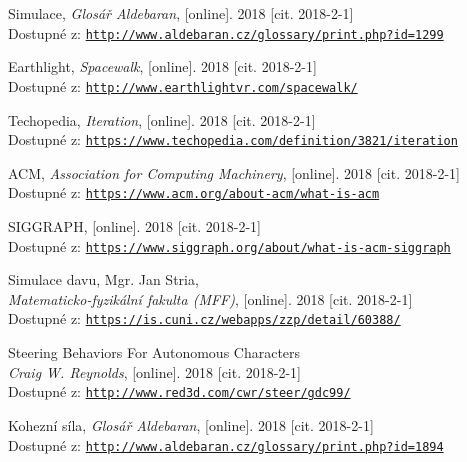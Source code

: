 \documentclass[czech,public,dept460,male,cpdeclaration]{diploma}
\begin{document}
\begin{thebibliography}{99}
	 Simulace,
		\textit{Glosář Aldebaran}, [online]. 2018 [cit. 2018-2-1]\\
		Dostupné z: \href{http://www.aldebaran.cz/glossary/print.php?id=1299}{\texttt{http://www.aldebaran.cz/glossary/print.php?id=1299}}
		
	
		
	 Earthlight,
		\textit{Spacewalk}, [online]. 2018 [cit. 2018-2-1]\\
		Dostupné z: \href{http://www.earthlightvr.com/spacewalk/}{\texttt{http://www.earthlightvr.com/spacewalk/}}
		
	 Techopedia,
		\textit{Iteration}, [online]. 2018 [cit. 2018-2-1]\\
		Dostupné z: \href{https://www.techopedia.com/definition/3821/iteration}{\texttt{https://www.techopedia.com/definition/3821/iteration}}
		
	 ACM,
		\textit{Association for Computing Machinery}, [online]. 2018 [cit. 2018-2-1]\\
		Dostupné z: \href{https://www.acm.org/about-acm/what-is-acm}{\texttt{https://www.acm.org/about-acm/what-is-acm}}
		
	 SIGGRAPH, [online]. 2018 [cit. 2018-2-1]\\
		Dostupné z: \href{https://www.siggraph.org/about/what-is-acm-siggraph}{\texttt{https://www.siggraph.org/about/what-is-acm-siggraph}}
		
	 Simulace davu, Mgr. Jan Stria,\\
		\textit{Matematicko-fyzikální fakulta (MFF)}, [online]. 2018 [cit. 2018-2-1]\\
		Dostupné z: \href{https://is.cuni.cz/webapps/zzp/detail/60388/}{\texttt{https://is.cuni.cz/webapps/zzp/detail/60388/}}
		
	 Steering Behaviors For Autonomous Characters\\
		\textit{Craig W. Reynolds}, [online]. 2018 [cit. 2018-2-1]\\
		Dostupné z: \href{http://www.red3d.com/cwr/steer/gdc99/}{\texttt{http://www.red3d.com/cwr/steer/gdc99/}}
		
	 Kohezní síla,
		\textit{Glosář Aldebaran}, [online]. 2018 [cit. 2018-2-1]\\
		Dostupné z: \href{http://www.aldebaran.cz/glossary/print.php?id=1894}{\texttt{http://www.aldebaran.cz/glossary/print.php?id=1894}}
		

\end{thebibliography}
\end{document}
